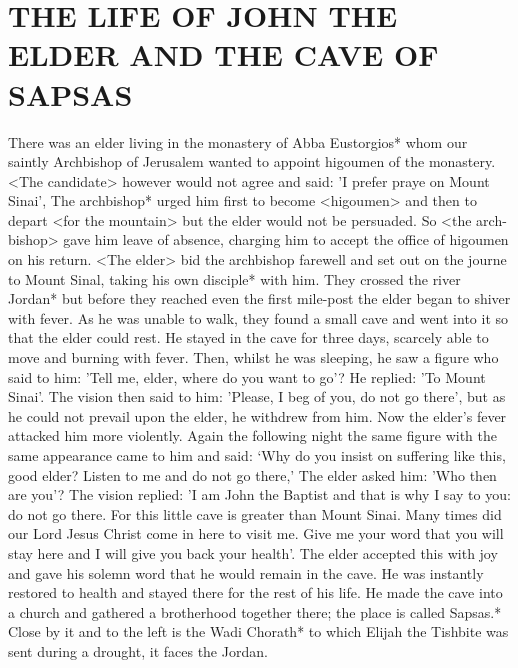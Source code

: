 \chapter{THE LIFE OF JOHN THE ELDER AND THE CAVE OF SAPSAS}

There was an elder living in the monastery of Abba Eustorgios*
whom our saintly Archbishop of Jerusalem wanted to appoint
higoumen of the monastery.
<The candidate> however would not agree and said: 'I prefer praye on Mount Sinai', The archbishop* urged him first to become <higoumen> and then to depart <for the mountain> but the elder would not be persuaded.
So <the arch-bishop> gave him leave of absence, charging him to accept the office of higoumen on his return.
<The elder> bid the archbishop farewell and set out on the journe to Mount Sinal, taking his own disciple* with him.
They crossed the river Jordan* but before they reached even the first mile-post the elder began to shiver with fever.
As he was unable to walk, they found a small cave and went into it so that the elder could rest.
He stayed in the cave for three days, scarcely able to move and burning with fever.
Then, whilst he was sleeping, he saw a figure who said to him: 'Tell me, elder, where do you want to go'?
He replied: 'To Mount Sinai'.
The vision then said to him: 'Please, I beg of you, do not go there', but as he could not prevail upon the elder, he withdrew from him.
Now the elder's fever attacked him more violently.
Again the following night the same figure with the same appearance came to him and said: `Why do you insist on suffering like this, good elder?
Listen to me and do not go there,' The elder asked him: 'Who then are you'?
The vision replied: 'I am John the Baptist and that is why I say to you: do not go there.
For this little cave is greater than Mount Sinai.
Many times did our Lord Jesus Christ come in here to visit me.
Give me your word that you will stay here and I will give you back your health'.
The elder accepted this with joy and gave his solemn word that he would remain in the cave.
He was instantly restored to health and stayed there for the rest of his life.
He made the cave into a church and gathered a brotherhood together there;
the place is called Sapsas.*
Close by it and to the left is the Wadi Chorath* to which Elijah the Tishbite was sent during a drought, it faces the Jordan.

